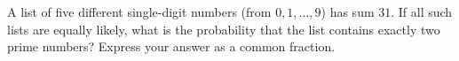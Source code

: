 A list of five different single-digit numbers (from $0,1,\dots,9$) has sum $31$. If all such lists are equally likely, what is the probability that the list contains exactly two prime numbers? Express your answer as a common fraction.

